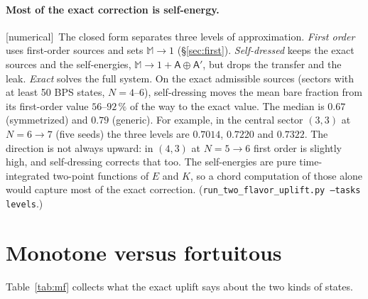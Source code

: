 \documentclass[11pt]{article}
\newcommand{\Mb}{\mathbb M}
\newcommand{\tagbox}[2]{\textsf{\small\color{#1}[#2]}}
\newcommand{\NUM}{\tagbox{cnum}{numerical}}
\theoremstyle{plain}
\theoremstyle{remark}
\numberwithin{equation}{section}
\begin{document}
\paragraph{Most of the exact correction is self-energy.} \NUM\ The closed form separates three levels of approximation.
\emph{First order} uses first-order sources and sets $\Mb\to1$ (\S\ref{sec:first}). \emph{Self-dressed} keeps the exact
sources and the self-energies, $\Mb\to1+\mathsf A\oplus\mathsf A'$, but drops the transfer and the leak. \emph{Exact}
solves the full system. On the exact admissible sources (sectors with at least 50 BPS states, $N=4$--$6$), self-dressing
moves the mean bare fraction from its first-order value $56$--$92\,\%$ of the way to the exact value. The median is
$0.67$ (symmetrized) and $0.79$ (generic). For example, in the central sector $(3,3)$ at $N=6\to7$ (five seeds) the
three levels are $0.7014$, $0.7220$ and $0.7322$. The direction is not always upward: in $(4,3)$ at $N=5\to6$ first order
is slightly high, and self-dressing corrects that too. The self-energies are pure time-integrated two-point functions
of $E$ and $K$, so a chord computation of those alone would capture most of the exact correction.
(\texttt{run\_two\_flavor\_uplift.py --tasks levels}.)

\section{Monotone versus fortuitous}\label{sec:summary}

Table~\ref{tab:mf} collects what the exact uplift says about the two kinds of states.
\end{document}
